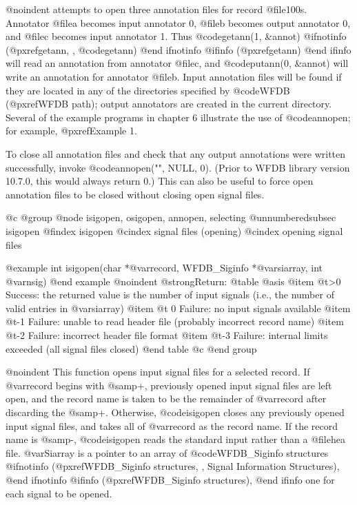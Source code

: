 {{{{{{{{@noindent
attempts to open three annotation files for record @file{100s}.
Annotator @file{a} becomes input annotator 0, @file{b} becomes output
annotator 0, and @file{c} becomes input annotator 1.  Thus
@code{getann(1, &annot)}
@ifnotinfo
(@pxref{getann, , @code{getann}})
@end ifnotinfo
@ifinfo
(@pxref{getann})
@end ifinfo
will read an annotation from annotator @file{c}, and
@code{putann(0, &annot)} will write an annotation for annotator @file{b}.
Input annotation files will be found if they are located in any of the
directories specified by @code{WFDB} (@pxref{WFDB path}); output annotators are
created in the current directory.  Several of the example programs in chapter 6
illustrate the use of @code{annopen}; for example, @pxref{Example 1}.

To close all annotation files and check that any output annotations were
written successfully, invoke @code{annopen("", NULL, 0)}.  (Prior to WFDB
library version 10.7.0, this would always return 0.)  This can also be useful
to force open annotation files to be closed without closing open signal files.

@c @group
@node     isigopen, osigopen, annopen, selecting
@unnumberedsubsec isigopen
@findex isigopen
@cindex signal files (opening)
@cindex opening signal files

@example
int isigopen(char *@var{record}, WFDB_Siginfo *@var{siarray}, int @var{nsig})
@end example
@noindent
@strong{Return:}
@table @asis
@item @t{>0}
Success: the returned value is the number of input signals (i.e., the
number of valid entries in @var{siarray})
@item @t{ 0}
Failure: no input signals available
@item @t{-1}
Failure: unable to read header file (probably incorrect record name)
@item @t{-2}
Failure: incorrect header file format
@item @t{-3}
Failure: internal limits exceeded (all signal files closed)
@end table
@c @end group

@noindent
This function opens input signal files for a selected record.  If
@var{record} begins with @samp{+}, previously opened input signal files
are left open, and the record name is taken to be the remainder of
@var{record} after discarding the @samp{+}.  Otherwise, @code{isigopen}
closes any previously opened input signal files, and takes all of
@var{record} as the record name.  If the record name is @samp{-},
@code{isigopen} reads the standard input rather than a @file{hea}
file.  @var{Siarray} is a pointer to an array of @code{WFDB_Siginfo}
structures
@ifnotinfo
(@pxref{WFDB_Siginfo structures, , Signal Information Structures}),
@end ifnotinfo
@ifinfo
(@pxref{WFDB_Siginfo structures}),
@end ifinfo
one for each signal to be opened.

}}}}}}}}

